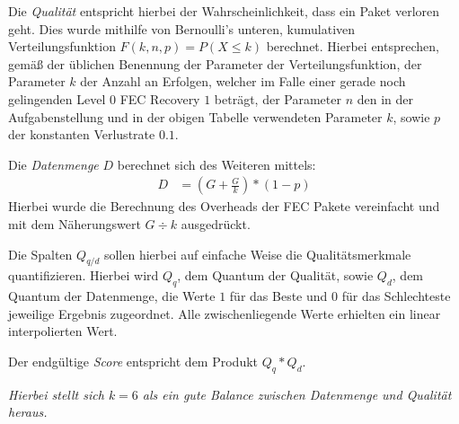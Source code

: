 \documentclass[a4paper,12pt]{article}
\begin{document}
Die \textit{Qualität} entspricht hierbei der Wahrscheinlichkeit, dass ein Paket verloren geht.
Dies wurde mithilfe von Bernoulli's unteren, kumulativen Verteilungsfunktion ${F(k,n,p) = P(X \leq k)}$ berechnet.
Hierbei entsprechen, gemäß der üblichen Benennung der Parameter der Verteilungsfunktion, der Parameter $k$ der Anzahl an Erfolgen, welcher im Falle einer gerade noch gelingenden Level 0 FEC Recovery $1$ beträgt, der Parameter $n$ den in der Aufgabenstellung und in der obigen Tabelle verwendeten Parameter $k$, sowie $p$ der konstanten Verlustrate $0.1$.

Die \textit{Datenmenge} $D$ berechnet sich des Weiteren mittels:
\begin{align*}
D &= \left(G + \frac{G}{k}\right) * \left(1 - p \right)
\end{align*}
Hierbei wurde die Berechnung des Overheads der FEC Pakete vereinfacht und mit dem Näherungswert $G \div k$ ausgedrückt.

Die Spalten $Q_{q/d}$ sollen hierbei auf einfache Weise die Qualitätsmerkmale quantifizieren.
Hierbei wird $Q_q$, dem Quantum der Qualität, sowie $Q_d$, dem Quantum der Datenmenge, die Werte $1$ für das Beste und $0$ für das Schlechteste jeweilige Ergebnis zugeordnet.
Alle zwischenliegende Werte erhielten ein linear interpolierten Wert.

Der endgültige \textit{Score} entspricht dem Produkt $Q_q * Q_d$.

\textit{Hierbei stellt sich $k = 6$ als ein gute Balance zwischen Datenmenge und Qualität heraus.}

\clearpage
\printbibliography
\end{document}
